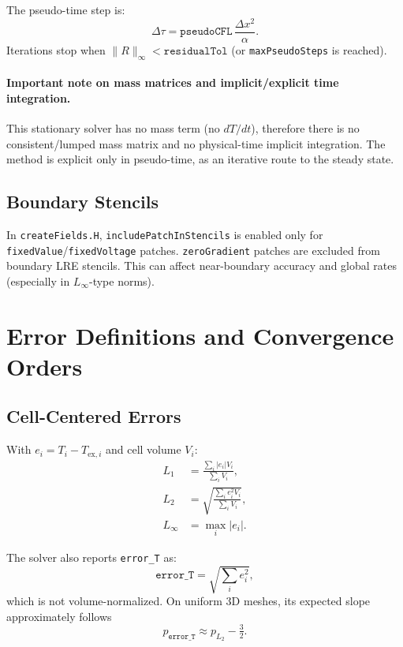\documentclass[11pt,a4paper]{article}
\begin{document}
The pseudo-time step is:
\begin{equation}
\Delta\tau = \texttt{pseudoCFL}\,\frac{\Delta x^2}{\alpha}.
\end{equation}
Iterations stop when $\lVert R \rVert_{\infty}<\texttt{residualTol}$ (or \texttt{maxPseudoSteps} is reached).

\paragraph{Important note on mass matrices and implicit/explicit time integration.}
This stationary solver has no mass term (no $dT/dt$), therefore there is no consistent/lumped mass matrix and no physical-time implicit integration. The method is explicit only in pseudo-time, as an iterative route to the steady state.

\subsection{Boundary Stencils}
In \texttt{createFields.H}, \texttt{includePatchInStencils} is enabled only for \texttt{fixedValue}/\texttt{fixedVoltage} patches.
\texttt{zeroGradient} patches are excluded from boundary LRE stencils. This can affect near-boundary accuracy and global rates (especially in $L_\infty$-type norms).

\section{Error Definitions and Convergence Orders}
\subsection{Cell-Centered Errors}
With $e_i = T_i - T_{\mathrm{ex},i}$ and cell volume $V_i$:
\begin{align}
L_1 &= \frac{\sum_i |e_i|V_i}{\sum_i V_i}, \\
L_2 &= \sqrt{\frac{\sum_i e_i^2 V_i}{\sum_i V_i}}, \\
L_\infty &= \max_i |e_i|.
\end{align}

The solver also reports \texttt{error\_T} as:
\begin{equation}
\texttt{error\_T}=\sqrt{\sum_i e_i^2},
\end{equation}
which is not volume-normalized. On uniform 3D meshes, its expected slope approximately follows
\begin{equation}
p_{\texttt{error\_T}} \approx p_{L_2}-\tfrac{3}{2}.
\end{equation}
\end{document}
